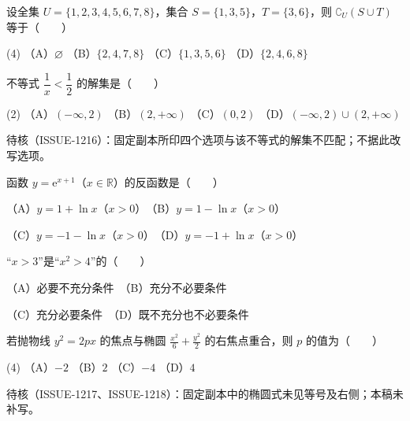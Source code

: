 \begin{question}
设全集 $U=\{1,2,3,4,5,6,7,8\}$，集合 $S=\{1,3,5\}$，$T=\{3,6\}$，则 $\complement_U(S\cup T)$ 等于\mbox{（　　）}

\begin{gkopts}(4)
\task （A）$\varnothing$
\task （B）$\{2,4,7,8\}$
\task （C）$\{1,3,5,6\}$
\task （D）$\{2,4,6,8\}$
\end{gkopts}

\end{question}
\begin{question}
不等式 $\dfrac1x<\dfrac12$ 的解集是\mbox{（　　）}

\begin{gkopts}(2)
\task （A）$(-\infty,2)$
\task （B）$(2,+\infty)$
\task （C）$(0,2)$
\task （D）$(-\infty,2)\cup(2,+\infty)$
\end{gkopts}

\begin{gktip}
待核（ISSUE-1216）：固定副本所印四个选项与该不等式的解集不匹配；不据此改写选项。
\end{gktip}

\end{question}
\begin{question}
函数 $y=\mathrm e^{x+1}$（$x\in\mathbb R$）的反函数是\mbox{（　　）}

（A）$y=1+\ln x$（$x>0$）　（B）$y=1-\ln x$（$x>0$）

（C）$y=-1-\ln x$（$x>0$）　（D）$y=-1+\ln x$（$x>0$）

\end{question}
\begin{question}
“$x>3$”是“$x^2>4$”的\mbox{（　　）}

（A）必要不充分条件　（B）充分不必要条件

（C）充分必要条件　（D）既不充分也不必要条件

\end{question}
\begin{question}
若抛物线 $y^2=2px$ 的焦点与椭圆 $\tfrac{x^2}{6}+\tfrac{y^2}{2}$ 的右焦点重合，则 $p$ 的值为\mbox{（　　）}

\begin{gkopts}(4)
\task （A）$-2$
\task （B）$2$
\task （C）$-4$
\task （D）$4$
\end{gkopts}

\begin{gktip}
待核（ISSUE-1217、ISSUE-1218）：固定副本中的椭圆式未见等号及右侧；本稿未补写。
\end{gktip}

\end{question}
